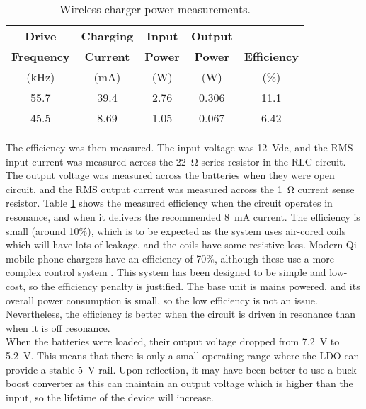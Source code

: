 \begin{table}[htb]
	\begin{center}
	\caption{Wireless charger power measurements.}
	\label{tab: efficiency}
	\begin{tabular}{|c|c|c|c|c|}
	\hline
	\textbf{Drive} & \textbf{Charging} & \textbf{Input} & \textbf{Output} & \\
	\textbf{Frequency} & \textbf{Current} & \textbf{Power} & \textbf{Power} & \textbf{Efficiency} \\
	(\si{\kilo\hertz}) & (\si{\milli\ampere}) & (\si{\watt}) & (\si{\watt}) & (\%)\\
	\hline
	55.7 & 39.4 & 2.76 & 0.306 & 11.1\\
	\hline
	45.5 & 8.69 & 1.05 & 0.067 & 6.42\\
	\hline	
	\end{tabular}
	\end{center}
\end{table}

The efficiency was then measured. The input voltage was \SI{12}{\volt}dc, and the RMS input current was measured across the \SI{22}{\ohm} series resistor in the RLC circuit. The output voltage was measured across the batteries when they were open circuit, and the RMS output current was measured across the \SI{1}{\ohm} current sense resistor. Table \ref{tab: efficiency} shows the measured efficiency when the circuit operates in resonance, and when it delivers the recommended \SI{8}{\milli\ampere} current. The efficiency is small (around 10\%), which is to be expected as the system uses air-cored coils which will have lots of leakage, and the coils have some resistive loss. Modern Qi mobile phone chargers have an efficiency of 70\%, although these use a more complex control system \cite{wireless_power_review}. This system has been designed to be simple and low-cost, so the efficiency penalty is justified. The base unit is mains powered, and its overall power consumption is small, so the low efficiency is not an issue. Nevertheless, the efficiency is better when the circuit is driven in resonance than when it is off resonance.\\ %

When the batteries were loaded, their output voltage dropped from \SI{7.2}{\volt} to \SI{5.2}{\volt}. This means that there is only a small operating range where the LDO can provide a stable \SI{5}{\volt} rail. Upon reflection, it may have been better to use a buck-boost converter as this can maintain an output voltage which is higher than the input, so the lifetime of the device will increase.







